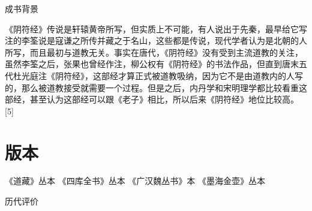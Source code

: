 \documentclass[12pt,UTF8]{ctexbook}
\begin{document}
成书背景

《阴符经》传说是轩辕黄帝所写，但实质上不可能，有人说出于先秦，最早给它写注的李筌说是寇谦之所传并藏之于名山，这些都是传说，现代学者认为是北朝的人所写，而且最初与道教无关。事实在唐代，《阴符经》没有受到主流道教的关注，虽然李筌之后，张果也曾经作注，柳公权有《阴符经》的书法作品，但直到唐末五代杜光庭注《阴符经》，这部经才算正式被道教吸纳，因为它不是由道教内的人写的，那么被道教接受就需要一个过程。但是之后，内丹学和宋明理学都比较看重这部经，甚至认为这部经可以跟《老子》相比，所以后来《阴符经》地位比较高。 [5]

\chapter{版本}

《道藏》丛本
《四库全书》丛本
《广汉魏丛书》本
《墨海金壶》丛本


历代评价
\end{document}
